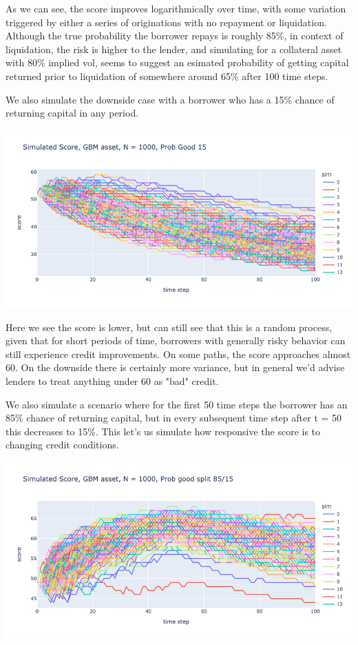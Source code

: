\documentclass{article}
\begin{document}
As we can see, the score improves logarithmically over time, with some variation triggered by either a series of originations with no repayment or liquidation. Although the true probability the borrower repays is roughly 85\%, in context of liquidation, the risk is higher to the lender, and simulating for a collateral asset with 80\% implied vol, seems to suggest an esimated probability of getting capital returned prior to liquidation of somewhere around 65\% after 100 time steps.

We also simulate the downside case with a borrower who has a 15\% chance of returning capital in any period.

\includegraphics[scale = 0.4]{p15.png}

Here we see the score is lower, but can still see that this is a random process, given that for short periods of time, borrowers with generally risky behavior can still experience credit improvements. On some paths, the score approaches almost 60. On the downside there is certainly more variance, but in general we'd advise lenders to treat anything under 60 as "bad" credit.

We also simulate a scenario where for the first 50 time steps the borrower has an 85\% chance of returning capital, but in every subsequent time step after t = 50 this decreases to 15\%. This let's us simulate how responsive the score is to changing credit conditions.

\includegraphics[scale = 0.4]{splitprob.png}
\end{document}
